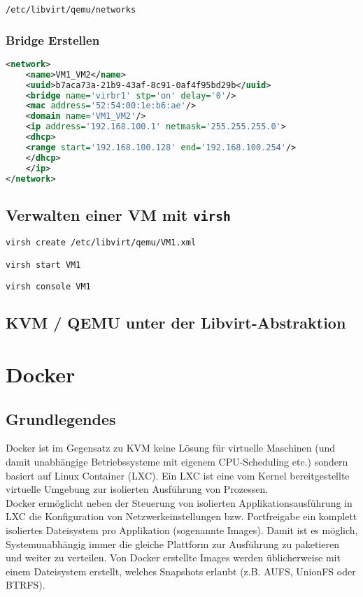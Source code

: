 \lstinline|/etc/libvirt/qemu/networks|

\subsubsection{Bridge Erstellen}
\begin{lstlisting}[language=xml]
<network>
	<name>VM1_VM2</name>
	<uuid>b7aca73a-21b9-43af-8c91-0af4f95bd29b</uuid>
	<bridge name='virbr1' stp='on' delay='0'/>
	<mac address='52:54:00:1e:b6:ae'/>
	<domain name='VM1_VM2'/>
	<ip address='192.168.100.1' netmask='255.255.255.0'>
	<dhcp>
	<range start='192.168.100.128' end='192.168.100.254'/>
	</dhcp>
	</ip>
</network>
\end{lstlisting}

\subsection{Verwalten einer VM mit \lstinline|virsh|}


\begin{lstlisting}[language=bash]
virsh create /etc/libvirt/qemu/VM1.xml

virsh start VM1 

virsh console VM1
\end{lstlisting}

\subsection{KVM / QEMU unter der Libvirt-Abstraktion}



\section{Docker}
\subsection{Grundlegendes}
Docker ist im Gegensatz zu KVM keine Lösung für virtuelle Maschinen (und damit unabhängige Betriebssysteme mit eigenem CPU-Scheduling etc.) sondern basiert auf Linux Container (LXC). Ein LXC ist eine vom Kernel bereitgestellte virtuelle Umgebung zur isolierten Ausführung von Prozessen. \\

Docker ermöglicht neben der Steuerung von isolierten Applikationsausführung in LXC die Konfiguration von Netzwerkeinstellungen bzw. Portfreigabe ein komplett isoliertes Dateisystem pro Applikation (sogenannte Images). Damit ist es möglich, Systemunabhängig immer die gleiche Plattform zur Ausführung zu paketieren und weiter zu verteilen. Von Docker erstellte Images werden üblicherweise mit einem Dateisystem erstellt, welches Snapshots erlaubt (z.B. AUFS, UnionFS oder BTRFS). \\

